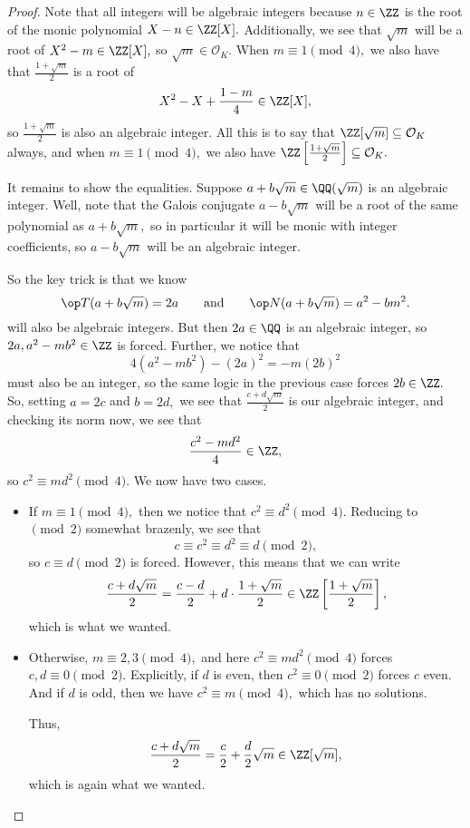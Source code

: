 \documentclass[../notes.tex]{subfiles}
\begin{document}
\begin{proof}
	Note that all integers will be algebraic integers because $n\in\ZZ$ is the root of the monic polynomial $X-n\in\ZZ[X].$ Additionally, we see that $\sqrt m$ will be a root of $X^2-m\in\ZZ[X],$ so $\sqrt m\in\mathcal O_K.$ When $m\equiv1\pmod4,$ we also have that $\frac{1+\sqrt m}2$ is a root of
	\[X^2-X+\frac{1-m}4\in\ZZ[X],\]
	so $\frac{1+\sqrt m}2$ is also an algebraic integer. All this is to say that $\ZZ[\sqrt m]\subseteq\mathcal O_K$ always, and when $m\equiv1\pmod4,$ we also have $\ZZ\left[\frac{1+\sqrt m}2\right]\subseteq\mathcal O_K.$

	It remains to show the equalities. Suppose $a+b\sqrt m\in\QQ(\sqrt m)$ is an algebraic integer. Well, note that the Galois conjugate $a-b\sqrt m$ will be a root of the same polynomial as $a+b\sqrt m,$ so in particular it will be monic with integer coefficients, so $a-b\sqrt m$ will be an algebraic integer.

	So the key trick is that we know
	\[\op T(a+b\sqrt m)=2a\qquad\text{and}\qquad\op N(a+b\sqrt m)=a^2-bm^2.\]
	will also be algebraic integers. But then $2a\in\QQ$ is an algebraic integer, so $2a,a^2-mb^2\in\ZZ$ is forced. Further, we notice that
	\[4\left(a^2-mb^2\right)-(2a)^2=-m(2b)^2\]
	must also be an integer, so the same logic in the previous case forces $2b\in\ZZ.$ So, setting $a=2c$ and $b=2d,$ we see that $\frac{c+d\sqrt m}2$ is our algebraic integer, and checking its norm now, we see that
	\[\frac{c^2-md^2}4\in\ZZ,\]
	so $c^2\equiv md^2\pmod4.$ We now have two cases.
	\begin{itemize}
		\item If $m\equiv1\pmod4,$ then we notice that $c^2\equiv d^2\pmod4.$ Reducing to$\pmod2$ somewhat brazenly, we see that
		\[c\equiv c^2\equiv d^2\equiv d\pmod2,\]
		so $c\equiv d\pmod2$ is forced. However, this means that we can write
		\[\frac{c+d\sqrt m}2=\frac{c-d}2+d\cdot\frac{1+\sqrt m}2\in\ZZ\left[\frac{1+\sqrt m}2\right],\]
		which is what we wanted.

		\item Otherwise, $m\equiv2,3\pmod4,$ and here $c^2\equiv md^2\pmod4$ forces $c,d\equiv0\pmod2.$ Explicitly, if $d$ is even, then $c^2\equiv0\pmod2$ forces $c$ even. And if $d$ is odd, then we have $c^2\equiv m\pmod4,$ which has no solutions.
		
		Thus,
		\[\frac{c+d\sqrt m}2=\frac c2+\frac d2\sqrt m\in\ZZ[\sqrt m],\]
		which is again what we wanted.
		\qedhere
	\end{itemize}
\end{proof}
\end{document}
